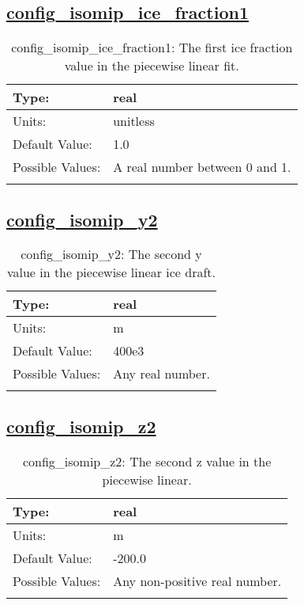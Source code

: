 \subsection[config\_isomip\_ice\_fraction1]{\hyperref[sec:nm_tab_isomip]{config\_isomip\_ice\_fraction1}}
\label{subsec:nm_sec_config_isomip_ice_fraction1}
\begin{center}
\begin{longtable}{| p{2.0in} || p{4.0in} |}
    \hline
    Type: & real \\
    \hline
    Units: & \si{unitless} \\
    \hline
    Default Value: & 1.0 \\
    \hline
    Possible Values: & A real number between 0 and 1. \\
    \hline
    \caption{config\_isomip\_ice\_fraction1: The first ice fraction value in the piecewise linear fit.}
\end{longtable}
\end{center}
\subsection[config\_isomip\_y2]{\hyperref[sec:nm_tab_isomip]{config\_isomip\_y2}}
\label{subsec:nm_sec_config_isomip_y2}
\begin{center}
\begin{longtable}{| p{2.0in} || p{4.0in} |}
    \hline
    Type: & real \\
    \hline
    Units: & \si{m} \\
    \hline
    Default Value: & 400e3 \\
    \hline
    Possible Values: & Any real number. \\
    \hline
    \caption{config\_isomip\_y2: The second y value in the piecewise linear ice draft.}
\end{longtable}
\end{center}
\subsection[config\_isomip\_z2]{\hyperref[sec:nm_tab_isomip]{config\_isomip\_z2}}
\label{subsec:nm_sec_config_isomip_z2}
\begin{center}
\begin{longtable}{| p{2.0in} || p{4.0in} |}
    \hline
    Type: & real \\
    \hline
    Units: & \si{m} \\
    \hline
    Default Value: & -200.0 \\
    \hline
    Possible Values: & Any non-positive real number. \\
    \hline
    \caption{config\_isomip\_z2: The second z value in the piecewise linear.}
\end{longtable}
\end{center}
